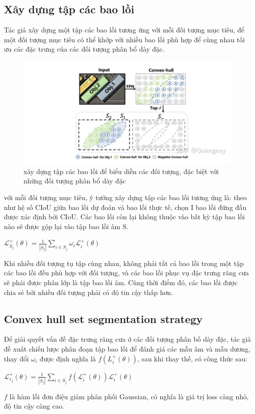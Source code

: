 \documentclass[12pt,a4paper,openany,oneside]{report}
\begin{document}
\subsection{Xây dựng tập các bao lồi}
Tác giả xây dựng một tập các bao lồi tương ứng với mỗi đối tượng mục tiêu, để một đối tượng mục tiêu có thể khớp với nhiều bao lồi phù hợp để cùng nhau tối ưu các đặc trưng của các đối tượng phân bổ dày đặc.

\begin{figure}[ht!]
	\begin{center}
		\includegraphics[width=445px]{./construction_convex_hull_set.jpg}
		\caption{xây dựng tập các bao lồi để biểu diễn các đối tượng, đặc biệt với những đối tượng phân bổ dày đặc}
		\label{fig_dhandang1}
	\end{center}
\end{figure} 
với mỗi đối tượng mục tiêu, ý tưởng xây dựng tập các bao lồi tương ứng là: theo như hệ số CIoU giữa bao lồi dự đoán và bao lồi thực tế, chọn I bao lồi đứng đầu được xác định bởi CIoU. Các bao lồi còn lại không thuộc vào bất kỳ tập bao lồi nào sẽ được gộp lại vào tập bao lồi âm S.
\begin{center}
$\mathcal{L}_{S_j}^{+}(\theta)=\frac{1}{\left|S_j\right|} \sum_{i \in S_j} \omega_i \mathcal{L}_i^{+}(\theta)$
\end{center}
Khi nhiều đối tượng tụ tập cùng nhau, không phải tất cả bao lồi trong một tập các bao lồi đều phù hợp với đối tượng, và các bao lồi phục vụ đặc trưng răng cưa sẽ phải được phân lớp là tập bao lồi âm. Cùng thời điểm đó, các bao lồi được chia sẻ bởi nhiều đối tượng phải có độ tin cậy thấp hơn.
\subsection{Convex hull set segmentation strategy}
Để giải quyết vấn đề đặc trưng răng cưa ở các đối tượng phân bố dày đặc, tác giả đề xuất chiến lược phân đoạn tập bao lồi để đánh giá các mẫu âm và mẫu dương, thay đổi $\omega_i$ được định nghĩa là $f\left(L_i^{+}(\theta)\right)$, sau khi thay thế, có công thức sau:
\begin{center}
	$\mathcal{L}_{s_j}^{+}(\theta)=\frac{1}{\left|S_j\right|} \sum_{i \in S_j} f\left(\mathcal{L}_i^{+}(\theta)\right) \mathcal{L}_i^{+}(\theta)$
\end{center}
$f$ là hàm lỗi đơn điệu giảm phân phối Gaussian, có nghĩa là giá trị loss càng nhỏ, độ tin cậy càng cao.
\end{document}
